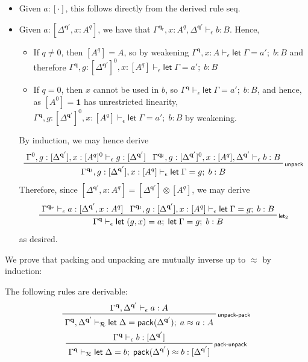 \documentclass[acmsmall,screen,anonymous,review]{acmart}
\newcommand{\mc}[1]{\ensuremath{\mathcal{#1}}}
\newcommand{\mb}[1]{\ensuremath{\mathbf{#1}}}
\newcommand{\ms}[1]{\ensuremath{\mathsf{#1}}}
\newcommand{\letexpr}[3]{\ensuremath{\ms{let}\;#1 = #2;\;#3}}
\newcommand{\rle}[1]{{\scriptsize\textsf{#1}}}
\newcommand{\hasty}[4]{#1 \vdash_{#2} #3: {#4}}
\newcommand{\teqv}{\approx}
\newcommand{\tmeq}[5]{#1 \vdash_{#2} #3 \teqv #4 : {#5}}
\newcommand{\brle}[1]{{\textsf{#1}}}
\newcommand{\etoty}[1]{[#1]}
\begin{document}
\begin{itemize}
  \item Given $a : \etoty{\cdot}$, this follows directly from the derived rule
  \brle{seq}.
  \item Given $a : \etoty{\Delta^{\mb{q}'}, x : A^q}$, we have that
  $\hasty{\Gamma^{\mb{q}_r}, x : A^q, \Delta^{\mb{q}'}}{\epsilon}{b}{B}$. Hence,
  \begin{itemize}
    \item If $q \neq 0$, then $[A^q] = A$, so by weakening $\hasty{\Gamma^{\mb{q}}, x :
    A}{\epsilon}{\letexpr{\Gamma}{a'}{b}}{B}$ and therefore $\hasty{\Gamma^{\mb{q}}, g:
    [\Delta^{\mb{q}'}]^0, x : [A^q]}{\epsilon}{\letexpr{\Gamma}{a'}{b}}{B}$
    \item If $q = 0$, then $x$ cannot be used in $b$, so
    $\hasty{\Gamma^{\mb{q}}}{\epsilon}{\letexpr{\Gamma}{a'}{b}}{B}$, and hence, as $[A^0] = \mb{1}$
    has unrestricted linearity, $\hasty{\Gamma^{\mb{q}}, g: [\Delta^{\mb{q}'}]^0, x :
    [A^q]}{\epsilon}{\letexpr{\Gamma}{a'}{b}}{B}$ by weakening.
  \end{itemize}
  By induction, we may hence derive
  \begin{equation*}
  \prftree[r]{\rle{unpack}}
    {\hasty{\Gamma^0, g: [\Delta^{\mb{q}'}], x : [A^q]^0}{\epsilon}{g}{[\Delta^{\mb{q}'}]}}
    {\hasty{\Gamma^{\mb{q}_l}, g: [\Delta^{\mb{q}'}]^0, x : [A^q], \Delta^{\mb{q}'}}{\epsilon}{b}{B}}
    {\hasty{\Gamma^{\mb{q}_l}, g: [\Delta^{\mb{q}'}], x : [A^q]}{\epsilon}{\letexpr{\Gamma}{g}{b}}{B}}
  \end{equation*}
  Therefore, since $[\Delta^{\mb{q}'}, x : A^q] = [\Delta^{\mb{q}'}] \otimes [A^q]$, we may derive
  \begin{equation*}
  \prftree[r]{\rle{let$_2$}}
    {\hasty{\Gamma^{\mb{q}_r}}{\epsilon}{a}{[\Delta^{\mb{q}'}, x : A^q]}}
    {\hasty{\Gamma^{\mb{q}_l}, g: [\Delta^{\mb{q}'}], x : [A^q]}{\epsilon}{\letexpr{\Gamma}{g}{b}}{B}}
    {\hasty{\Gamma^{\mb{q}}}{\epsilon}{\letexpr{(g, x)}{a}{\letexpr{\Gamma}{g}{b}}}{B}}
  \end{equation*}
  as desired.
\end{itemize}
We prove that packing and unpacking are mutually inverse up to $\approx$ by induction:
\begin{lemma}
  The following rules are derivable:
  \begin{gather*}
  \prftree[r]{\rle{unpack-pack}}
    {\hasty{\Gamma^{\mb{q}}, \Delta^{\mb{q}'}}{\epsilon}{a}{A}}
    {\tmeq{\Gamma^{\mb{q}}, \Delta^{\mb{q}'}}{\mc{R}} 
      {\letexpr{\Delta}{\ms{pack}(\Delta^{\mb{q}'})}{a}}{a}{A}}
    \\
  \prftree[r]{\rle{pack-unpack}}
    {\hasty{\Gamma^{\mb{q}}}{\epsilon}{b}{[\Delta^{\mb{q}'}]}}
    {\tmeq{\Gamma^{\mb{q}}}{\mc{R}}{\letexpr{\Delta}{b}{\ms{pack}(\Delta^{\mb{q}'})}}{b}
      {[\Delta^{\mb{q}'}]}}
  \end{gather*}
\end{lemma}
\end{document}
